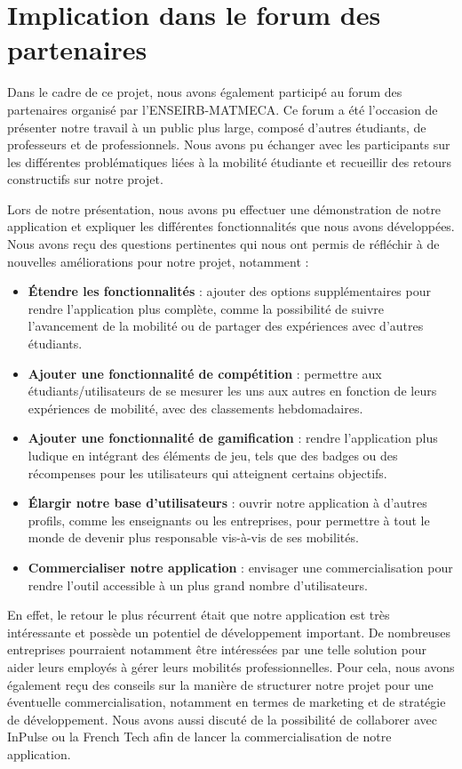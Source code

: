 \newpage
\section{Implication dans le forum des partenaires}

Dans le cadre de ce projet, nous avons également participé au forum des partenaires organisé par l'ENSEIRB-MATMECA. Ce forum a été l'occasion de présenter notre travail à un public plus large, composé d'autres étudiants, de professeurs et de professionnels. Nous avons pu échanger avec les participants sur les différentes problématiques liées à la mobilité étudiante et recueillir des retours constructifs sur notre projet.

Lors de notre présentation, nous avons pu effectuer une démonstration de notre application et expliquer les différentes fonctionnalités que nous avons développées. Nous avons reçu des questions pertinentes qui nous ont permis de réfléchir à de nouvelles améliorations pour notre projet, notamment :

\begin{itemize}
\item \textbf{Étendre les fonctionnalités} : ajouter des options supplémentaires pour rendre l'application plus complète, comme la possibilité de suivre l'avancement de la mobilité ou de partager des expériences avec d'autres étudiants.

\item \textbf{Ajouter une fonctionnalité de compétition} : permettre aux étudiants/utilisateurs de se mesurer les uns aux autres en fonction de leurs expériences de mobilité, avec des classements hebdomadaires.
\item \textbf{Ajouter une fonctionnalité de gamification} : rendre l'application plus ludique en intégrant des éléments de jeu, tels que des badges ou des récompenses pour les utilisateurs qui atteignent certains objectifs.
\item \textbf{Élargir notre base d'utilisateurs} : ouvrir notre application à d'autres profils, comme les enseignants ou les entreprises, pour permettre à tout le monde de devenir plus responsable vis-à-vis de ses mobilités.
\item \textbf{Commercialiser notre application} : envisager une commercialisation pour rendre l'outil accessible à un plus grand nombre d'utilisateurs.
\end{itemize}

En effet, le retour le plus récurrent était que notre application est très intéressante et possède un potentiel de développement important. De nombreuses entreprises pourraient notamment être intéressées par une telle solution pour aider leurs employés à gérer leurs mobilités professionnelles.
Pour cela, nous avons également reçu des conseils sur la manière de structurer notre projet pour une éventuelle commercialisation, notamment en termes de marketing et de stratégie de développement. Nous avons aussi discuté de la possibilité de collaborer avec InPulse ou la French Tech afin de lancer la commercialisation de notre application.
